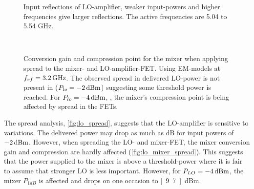 			\begin{figure}[hbt!]
				\centering
				\caption[Input reflections of LO-amplifier]{Input reflections of LO-amplifier, weaker input-powers and higher frequencies give larger reflections. The active frequencies are 5.04 to 5.54 GHz.}\label{fig:lo_reflections}
			\end{figure}



			\begin{figure}[hpt!]
				\centering
				 \\
				\caption{Conversion gain and compression point for the mixer when applying spread to the mixer- and LO-amplifier-FET. Using EM-models at $f_{rf}=\unit[3.2]{GHz}$. The observed spread in delivered LO-power is not present in  ($P_{lo}=\unit[-2]{dBm}$) suggesting some threshold power is reached. For $P_{lo}=\unit[-4]{dBm}$, , the mixer's compression point is being affected by spread in the FETs.}\label{fig:lo_mixer_spread}
			\end{figure}





			The spread analysis, \autoref{fig:lo_spread}, suggests that the LO-amplifier is sensitive to variations. The delivered power may drop as much as \unit[2]{dB} for input powers of $\unit[-2]{dBm}$. %
			However, when spreading the LO- and mixer-FET, the mixer conversion gain and compression are hardly affected (\autoref{fig:lo_mixer_spread}). This suggests that the power supplied to the mixer is above a threshold-power where it is fair to assume that stronger LO is less important\autocite{yhland1999}. However, for $P_{LO}=\unit[-4]{dBm}$, the mixer $P_{1dB}$ is affected and drops on one occasion to \unit[9.7]{dBm}.



